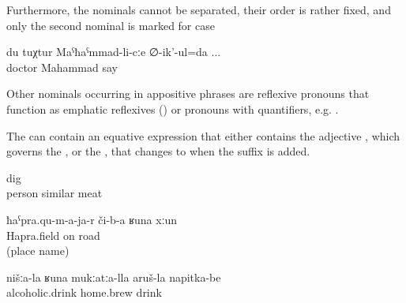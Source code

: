 Furthermore, the nominals cannot be separated, their order is rather fixed, and only the second nominal is marked for case 

\begin{exe}
	\ex	\label{ex:I say to Doctor Mahammad}
	\gll	du	tuχtur	Maˁħaˁmmad-li-cːe	∅-ik'-ul=da ...\\
			doctor		Mahammad	say\\
	\glt	{}
\end{exe}

Other nominals occurring in appositive phrases are reflexive pronouns that function as emphatic reflexives () or pronouns with quantifiers, e.g.  .

The  can contain an equative expression that either contains the adjective , which governs the  , or the   ,  that changes to  when the suffix  is added.\largerpage

\begin{exe}

		\ex	\label{ex:meat similar to human (flesh)}
			dig\\
			person	similar	meat\\
		\glt	{}
		
		
		\ex	\label{ex:a road like through hapraqu@9a}
		\gll	ħaˁpra.qu-m-a-ja-r	či-b-a	ʁuna	xːun\\
			Hapra.field	on		road\\
		\glt	{} (place name)

	
		\ex	\label{ex:drinks like our alcoholic homebrew}
		\gll	nišːa-la	ʁuna	mukːatːa-lla	aruš-la	napitka-be\\
					alcoholic.drink\tsc{-gen}	home.brew	drink \\
		\glt	{}

\end{exe}


